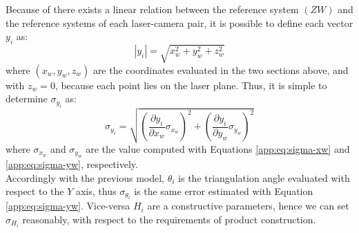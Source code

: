 Because of there exists a linear relation between the reference system $(ZW)$ and the reference systems of each laser-camera pair, it is possible to define each vector $y_i$ as:
  \begin{equation*}
    |y_i| = \sqrt{x_w^2 + y_w^2 + z_w^2}
  \end{equation*}
where $\left( x_w, y_w, z_w \right)$ are the coordinates evaluated in the two sections above, and with $z_w = 0$, because each point lies on the laser plane. Thus, it is simple to determine $\sigma_{y_i}$ as:
  \begin{equation*}
    \sigma_{y_i} = \sqrt{
      \left( \frac{\partial y_i}{\partial x_w} \sigma_{x_w} \right)^2 + 
      \left( \frac{\partial y_i}{\partial y_w} \sigma_{y_w} \right)^2
    }
  \end{equation*}
where $\sigma_{x_w}$ and $\sigma_{y_w}$ are the value computed with Equations \ref{app:eq:sigma-xw} and \ref{app:eq:sigma-yw}, respectively. \\

Accordingly with the previous model, $\theta_i$ is the triangulation angle evaluated with respect to the $Y$ axis, thus $\sigma_{\theta_i}$ is the same error estimated with Equation \ref{app:eq:sigma-yw}. Vice-versa $H_i$ are a constructive parameters, hence we can set $\sigma_{H_i}$ reasonably, with respect to the requirements of product construction.
